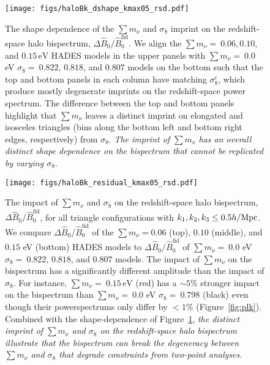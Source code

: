 \documentclass[12pt, letterpaper, preprint]{aastex62}
\newcommand{\smnu}{\sum m_\nu}
\newcommand{\sig}{\sigma_8}
\newcommand{\BOk}{\widehat{B}_0}
\begin{document}
\begin{figure}
\begin{center}
\texttt{[image: figs/haloBk\_dshape\_kmax05\_rsd.pdf]} 
    \caption{The shape dependence of the $\smnu$ and $\sig$ imprint on 
    the redshift-space halo bispectrum, $\Delta \BOk/\BOk^\mathrm{fid}$. 
    We align the $\smnu{=}~0.06, 0.10$, and $0.15\,\mathrm{eV}$ HADES models 
    in the upper panels with $\smnu{=}~0.0$ eV $\sig{=}~0.822$, $0.818$, and $0.807$ 
    models on the bottom such that the top and bottom panels in each column 
    have matching $\sig^{c}$, which produce mostly degenerate imprints on the 
    redshift-space power spectrum. The difference between the top and bottom 
    panels highlight that $\smnu$ leaves a distinct imprint on elongated and 
    isosceles triangles (bins along the bottom left and bottom right edges, 
    respectively) from $\sig$. {\em The imprint of $\smnu$ has an overall 
    distinct shape dependence on the bispectrum that cannot be replicated by 
    varying $\sig$}. 
    }
\label{fig:dbk_shape}
\end{center}
\end{figure}

\begin{figure}
\begin{center}
\texttt{[image: figs/haloBk\_residual\_kmax05\_rsd.pdf]}
    \caption{The impact of $\smnu$ and $\sig$ on the redshift-space halo bispectrum,
    $\Delta \BOk/\BOk^\mathrm{fid}$, for all triangle configurations with 
    $k_1, k_2, k_3 \leq 0.5 h/{\rm Mpc}$. We compare $\Delta \BOk/\BOk^\mathrm{fid}$ 
    of the $\smnu = 0.06$ (top), $0.10$ (middle), and $0.15$ eV (bottom) HADES models
    to $\Delta \BOk/\BOk^\mathrm{fid}$ of $\smnu{=}~0.0$ eV $\sig{=}~0.822$, $0.818$, and 
    $0.807$ models. The impact of $\smnu$ on the bispectrum has a significantly different 
    amplitude than the impact of $\sig$. For instance, $\smnu{=}~0.15\,\mathrm{eV}$ (red) 
    has a $\sim 5\%$ stronger impact on the bispectrum than $\smnu{=}~0.0$ eV  
    $\sig{=}~0.798$ (black) even though their powerspectrums only differ by $< 1\%$ 
    (Figure~\ref{fig:plk}). Combined with the shape-dependence of Figure~\ref{fig:dbk_shape}, 
    {\em the distinct imprint of $\smnu$ and $\sig$ on the redshift-space halo bispectrum 
    illustrate that the bispectrum can break the degeneracy between $\smnu$ and $\sig$ 
    that degrade constraints from two-point analyses}.
    }
\label{fig:dbk_amp}
\end{center}
\end{figure}
\end{document}
